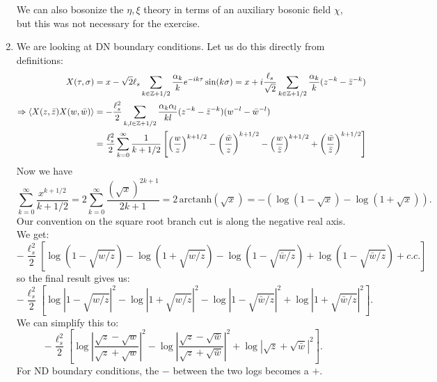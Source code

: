 \documentclass[11pt]{article}
\begin{document}
\begin{enumerate}
	We can also bosonize the $\eta, \xi$ theory in terms of an auxiliary bosonic field $\chi$, but this was not necessary for the exercise. 
	
	\item We are looking at DN boundary conditions. Let us do this directly from definitions:
	\[
	\begin{aligned}
		X(\tau, \sigma) &= x - \sqrt{2} \ell_s \sum_{k \in \mathbb Z + 1/2} \frac{\alpha_k}{k} e^{-i k \tau} \sin(k \sigma) = x + i \frac{\ell_s}{\sqrt 2} \sum_{k \in \mathbb Z + 1/2} \frac{\alpha_k}{k} (z^{-k} - \bar z^{-k})\\
		\Rightarrow \braket{X(z, \bar z) X(w, \bar w)} &= -\frac{\ell_s^2}{2} \sum_{k, l \in \mathbb Z + 1/2} \frac{\alpha_{k} \alpha_l}{k l} (z^{-k} - \bar z^{-k}) (w^{-l} - \bar w^{-l})\\
		&= \frac{\ell_s^2}{2} \sum_{k = 0}^\infty \frac{1}{k+1/2} \left[ \left(\frac{w}{z} \right)^{k+1/2} - \left(\frac{\bar w}{z} \right)^{k+1/2} - \left(\frac{w}{\bar z} \right)^{k+1/2} + \left(\frac{\bar w}{\bar z} \right)^{k+1/2} \right]
	\end{aligned}
	\]
	Now we have \[
		\sum_{k=0}^\infty \frac{x^{k+1/2}}{k+1/2} = 2 \sum_{k=0}^\infty \frac{(\sqrt x)^{2k+1}}{2k+1} = 2\, \mathrm{arctanh}(\sqrt{x}) = - ( \log(1-\sqrt x) - \log(1+\sqrt x)).
	\]
	Our convention on the square root branch cut is along the negative real axis. We get:
	\[
		-\frac{\ell_s^2}{2} \left[\log(1 - \sqrt{w/z}) - \log(1 + \sqrt{w/z})  - \log(1 - \sqrt{\bar w/z}) + \log(1 - \sqrt{\bar w/z}) + c.c. \right]
	\]
	so the final result gives us:
	\[
		- \frac{\ell_s^2}{2} \left[ \log|1 - \sqrt{w/z}|^2 - \log|1 + \sqrt{w/z}|^2 - \log|1 - \sqrt{\bar w/z}|^2 +  \log|1 + \sqrt{\bar w/z}|^2 \right].
	\]
	We can simplify this to:
	\[
		- \frac{\ell_s^2}{2} \left[ \log|\frac{\sqrt{z} - \sqrt{w}}{\sqrt{z} + \sqrt{w}}|^2 - \log|\frac{\sqrt{z} - \sqrt{\bar w}}{\sqrt z + \sqrt{\bar w}}|^2 + \log|\sqrt{z} + \sqrt{\bar w}|^2 \right].
	\]
	For ND boundary conditions, the $-$ between the two logs becomes a $+$.
	

\end{enumerate}
\end{document}
